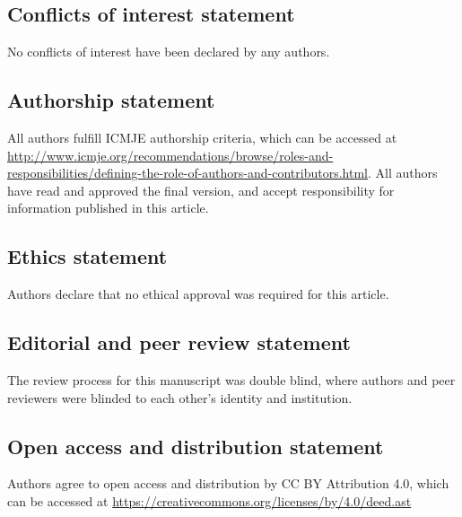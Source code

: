 \subsection*{Conflicts of interest statement}
No conflicts of interest have been declared by any authors.

\subsection*{Authorship statement}
All authors fulfill ICMJE authorship criteria, which can be accessed at \url{http://www.icmje.org/recommendations/browse/roles-and-responsibilities/defining-the-role-of-authors-and-contributors.html}. All authors have read and approved the final version, and accept responsibility for information published in this article.

\subsection*{Ethics statement}
Authors declare that no ethical approval was required for this article.

\subsection*{Editorial and peer review statement}
The review process for this manuscript was double blind, where authors and peer reviewers were blinded to each other's identity and institution.

\subsection*{Open access and distribution statement}
Authors agree to open access and distribution by CC BY Attribution 4.0, which can be accessed at \url{https://creativecommons.org/licenses/by/4.0/deed.ast}

